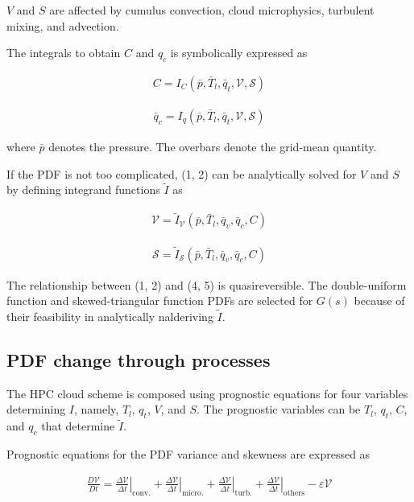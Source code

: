 \(V\) and \(S\) are affected by cumulus convection, cloud microphysics,
turbulent mixing, and advection.

The integrals to obtain \(C\) and \(q_c\) is symbolically expressed as

\begin{eqnarray}
C=I_{C}\left(\bar{p}, \bar{T}_{l}, \bar{q}_{t}, \mathcal{V}, \mathcal{S}\right)
\label{W09-1}
\end{eqnarray}

\begin{eqnarray}
\bar{q}_{c}=I_{q}\left(\bar{p}, \bar{T}_{l}, \bar{q}_{t}, \mathcal{V}, \mathcal{S}\right)
\label{W09-2}
\end{eqnarray}

where \(\bar{p}\) denotes the pressure. The overbars denote the
grid-mean quantity.

If the PDF is not too complicated, (1, 2) can be analytically solved for
\(V\) and \(S\) by defining integrand functions \({\tilde{I}}\) as

\begin{eqnarray}
\mathcal{V}=\tilde{I}_{\mathcal{V}} \left(\bar{p}, \bar{T}_{l}, \bar{{q}}_{v}, \bar{q}_{c}, C\right)
\label{W09-4}
\end{eqnarray}

\begin{eqnarray}
\mathcal{S}=\tilde{I}_{\mathcal{S}} \left(\bar{p}, \bar{T}_{l}, \bar{{q}}_{v}, \bar{q}_{c}, C\right)
\label{W09-5}
\end{eqnarray}

The relationship between (1, 2) and (4, 5) is quasireversible. The
double-uniform function and skewed-triangular function PDFs are selected
for \(G(s)\) because of their feasibility in analytically nalderiving
\({\tilde{I}}\).

\hypertarget{pdf-change-through-processes}{%
\subsection{PDF change through
processes}\label{pdf-change-through-processes}}

The HPC cloud scheme is composed using prognostic equations for four
variables determining \(I\), namely, \(T_l\), \(q_t\), \(V\), and \(S\).
The prognostic variables can be \(T_l\), \(q_t\), \(C\), and \(q_c\)
that determine \(\tilde {I}\).

Prognostic equations for the PDF variance and skewness are expressed as

\begin{eqnarray}
\frac{D \mathcal{V}}{D t}=\left.\frac{\Delta \mathcal{V}}{\Delta t}\right|_{\mathrm{conv.}}+\left.\frac{\Delta \mathcal{V}}{\Delta t}\right|_{\mathrm{micro.}}+\left.\frac{\Delta \mathcal{V}}{\Delta t}
\right|_{\mathrm{turb.}}+\left.\frac{\Delta \mathcal{V}}{\Delta t}
\right|_{\mathrm{others}}-\varepsilon \mathcal{V}
\end{eqnarray}

